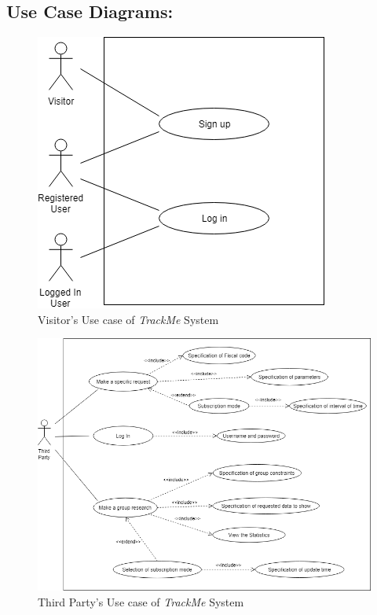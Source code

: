 \subsection{Use Case Diagrams:}
\begin{figure}[H]
    \centering
    \includegraphics[scale=0.4]{./Pictures/trackMeUseCaseVisitor.png}
    \caption{Visitor's Use case of \emph{TrackMe} System}
\end{figure}

\begin{figure}[H]
    \centering
    \includegraphics[scale=0.4]{./Pictures/trackMeUseCaseThirdParty.png}
    \caption{Third Party's Use case of \emph{TrackMe} System}
\end{figure}

